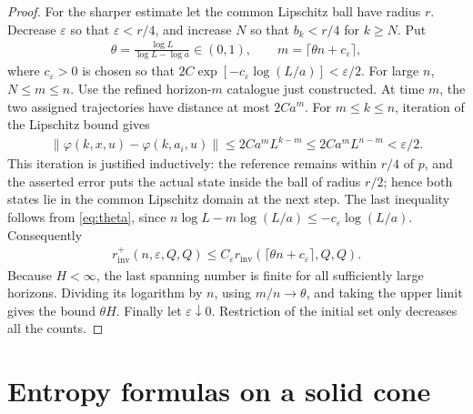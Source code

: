 \documentclass[11pt,a4paper]{article}
\theoremstyle{definition}
\theoremstyle{remark}
\begin{document}
\begin{proof}
For the sharper estimate let the common Lipschitz ball have radius \(r\). Decrease \(\varepsilon\) so that \(\varepsilon<r/4\), and increase \(N\) so that \(b_k<r/4\) for \(k\geq N\). Put
\begin{align}\label{eq:theta}
 \theta=\frac{\log L}{\log L-\log a}\in(0,1),
 \qquad m=\lceil\theta n+c_\varepsilon\rceil,
\end{align}
where \(c_\varepsilon>0\) is chosen so that
\(2C\exp[-c_\varepsilon\log(L/a)]<\varepsilon/2\).
For large \(n\), \(N\leq m\leq n\). Use the refined horizon-\(m\) catalogue just constructed. At time \(m\), the two assigned trajectories have distance at most \(2Ca^m\). For \(m\leq k\leq n\), iteration of the Lipschitz bound gives
\begin{align}\label{eq:tail-tracking}
 \|\varphi(k,x,u)-\varphi(k,a_i,u)\|
 \leq 2Ca^m L^{k-m}
 \leq 2Ca^m L^{n-m}<\varepsilon/2.
\end{align}
This iteration is justified inductively: the reference remains within \(r/4\) of \(p\), and the asserted error puts the actual state inside the ball of radius \(r/2\); hence both states lie in the common Lipschitz domain at the next step. The last inequality follows from \eqref{eq:theta}, since
\(n\log L-m\log(L/a)\leq-c_\varepsilon\log(L/a)\).
Consequently
\begin{align}
 r_{\mathrm{inv}}^+(n,\varepsilon,Q,Q)
 \leq C_\varepsilon
 r_{\mathrm{inv}}(\lceil\theta n+c_\varepsilon\rceil,Q,Q).
\end{align}
Because \(H<\infty\), the last spanning number is finite for all sufficiently large horizons. Dividing its logarithm by \(n\), using \(m/n\to\theta\), and taking the upper limit gives the bound \(\theta H\). Finally let \(\varepsilon\downarrow0\). Restriction of the initial set only decreases all the counts.
\end{proof}

\section{Entropy formulas on a solid cone}\label{sec:cone}
\end{document}
